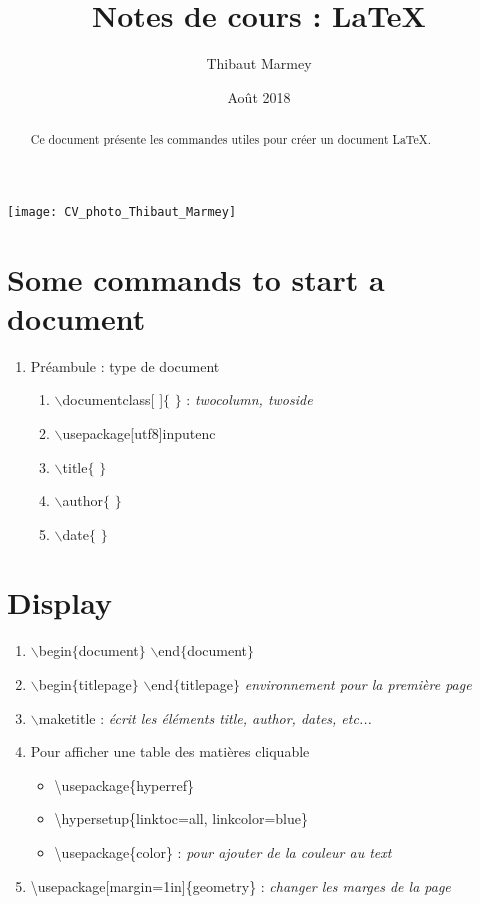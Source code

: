 \documentclass[12pt, letterpaper]{article}
\title{Notes de cours : \LaTeX}
\author{Thibaut Marmey}
\date{Août 2018}
\begin{document}
\maketitle
\begin{center}
\texttt{[image: CV\_photo\_Thibaut\_Marmey]}
\end{center}
\vspace{0.25cm}
\renewcommand{\abstractname}{Résumé}
\begin{abstract}
Ce document présente les commandes utiles pour créer un document \LaTeX.
\end{abstract}

\tableofcontents

\newpage
\section{Some commands to start a document}
\begin{enumerate}
\item Préambule : type de document
\begin{enumerate}
\item $\backslash$documentclass[ ]$\lbrace$ $\rbrace$ : \textit{twocolumn, twoside}
\item $\backslash$usepackage[utf8]{inputenc}
\item $\backslash$title$\lbrace$ $\rbrace$
\item $\backslash$author$\lbrace$ $\rbrace$
\item $\backslash$date$\lbrace$ $\rbrace$
\end{enumerate}
\end{enumerate}

\section{Display}
\begin{enumerate}
\item $\backslash$begin$\lbrace$document$\rbrace$  $\backslash$end$\lbrace$document$\rbrace$
\item $\backslash$begin$\lbrace$titlepage$\rbrace$  $\backslash$end$\lbrace$titlepage$\rbrace$ \textit{environnement pour la première page}
\item $\backslash$maketitle : \textit{écrit les éléments title, author, dates, etc...}
\item Pour afficher une table des matières cliquable
\begin{itemize}
\item \textbackslash usepackage\{hyperref\}
\item \textbackslash hypersetup\{linktoc=all, linkcolor=blue\}
\item \textbackslash usepackage\{color\} : \textit{pour ajouter de la couleur au text}
\end{itemize}
\item \textbackslash usepackage[margin=1in]\{geometry\} : \textit{changer les marges de la page}
\end{enumerate}
\end{document}
